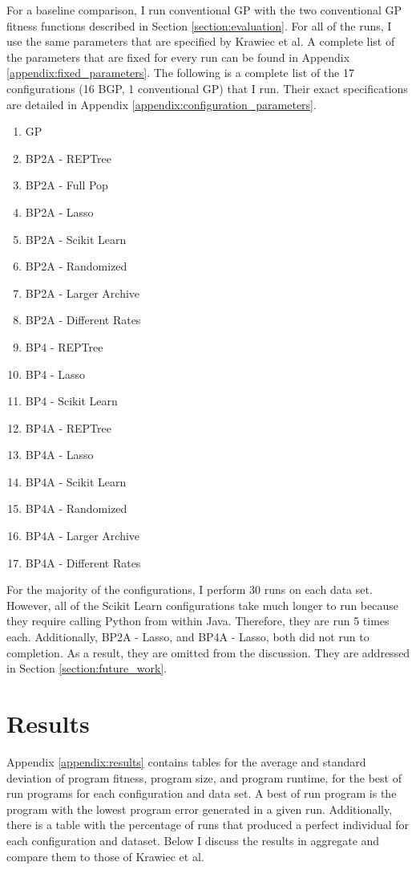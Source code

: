 For a baseline comparison, I run conventional GP with the two conventional GP fitness functions described in Section \ref{section:evaluation}.  For all of the runs, I use the same parameters that are specified by Krawiec et al.  A complete list of the parameters that are fixed for every run can be found in Appendix \ref{appendix:fixed_parameters}.  The following is a complete list of the 17 configurations (16 BGP, 1 conventional GP) that I run.  Their exact specifications are detailed in Appendix \ref{appendix:configuration_parameters}.

\begin{multicols}{2}
\begin{enumerate}
\item GP
\item BP2A - REPTree
\item BP2A - Full Pop
\item BP2A - Lasso
\item BP2A - Scikit Learn
\item BP2A - Randomized
\item BP2A - Larger Archive
\item BP2A - Different Rates
\item BP4 - REPTree
\item BP4 - Lasso
\item BP4 - Scikit Learn
\item BP4A - REPTree
\item BP4A - Lasso
\item BP4A - Scikit Learn
\item BP4A - Randomized
\item BP4A - Larger Archive
\item BP4A - Different Rates
\end{enumerate}
\end{multicols}

For the majority of the configurations, I perform 30 runs on each data set.  However, all of the Scikit Learn configurations take much longer to run because they require calling Python from within Java.  Therefore, they are run 5 times each.  Additionally, BP2A - Lasso, and BP4A - Lasso, both did not run to completion.  As a result, they are omitted from the discussion.  They are addressed in Section \ref{section:future_work}.

\section{Results}
Appendix \ref{appendix:results} contains tables for the average and standard deviation of program fitness, program size, and program runtime, for the best of run programs for each configuration and data set.  A best of run program is the program with the lowest program error generated in a given run.  Additionally, there is a table with the percentage of runs that produced a perfect individual for each configuration and dataset.  Below I discuss the results in aggregate and compare them to those of Krawiec et al.

